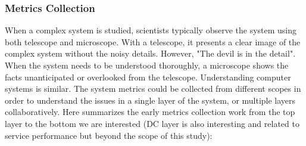 \subsubsection{Metrics Collection}

When a complex system is studied, scientists typically observe the system using both telescope and microscope. With a telescope, it presents a clear image of the complex system without the noisy details. However, "The devil is in the detail". When the system needs to be understood thoroughly, a microscope shows the facts unanticipated or overlooked from the telescope. Understanding computer systems is similar. The system metrics could be collected from different scopes in order to understand the issues in a single layer of the system, or multiple layers collaboratively. Here summarizes the early metrics collection work  from the top layer to the bottom we are interested (DC layer is also interesting and related to service performance but beyond the scope of this study):
